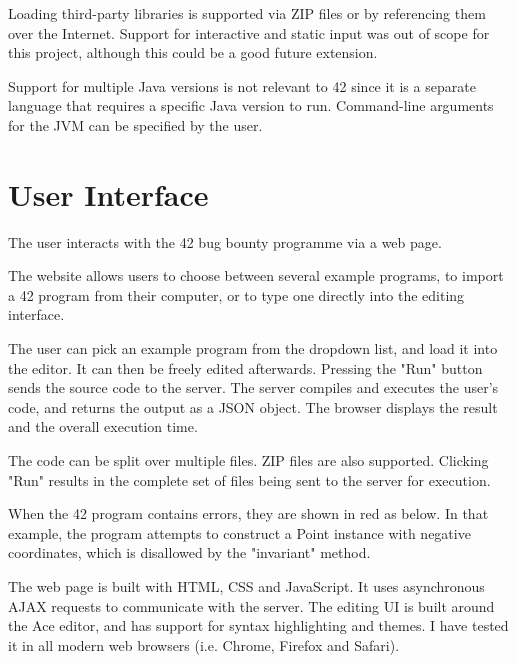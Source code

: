 Loading third-party libraries is supported via ZIP files or by referencing them over the Internet. Support for interactive and static input was out of scope for this project, although this could be a good future extension.

Support for multiple Java versions is not relevant to 42 since it is a separate language that requires a specific Java version to run. Command-line arguments for the JVM can be specified by the user.

\chapter{User Interface}

The user interacts with the 42 bug bounty programme via a web page.

The website allows users to choose between several example programs, to import a 42 program from their computer, or to type one directly into the editing interface.

The user can pick an example program from the dropdown list, and load it into the editor. It can then be freely edited afterwards. Pressing the "Run" button sends the source code to the server. The server compiles and executes the user's code, and returns the output as a JSON object. The browser displays the result and the overall execution time.


The code can be split over multiple files. ZIP files are also supported. Clicking "Run" results in the complete set of files being sent to the server for execution.


When the 42 program contains errors, they are shown in red as below. In that example, the program attempts to construct a Point instance with negative coordinates, which is disallowed by the "invariant" method.


The web page is built with HTML, CSS and JavaScript. It uses asynchronous AJAX requests to communicate with the server. The editing UI is built around the Ace editor, and has support for syntax highlighting and themes. I have tested it in all modern web browsers (i.e. Chrome, Firefox and Safari).

